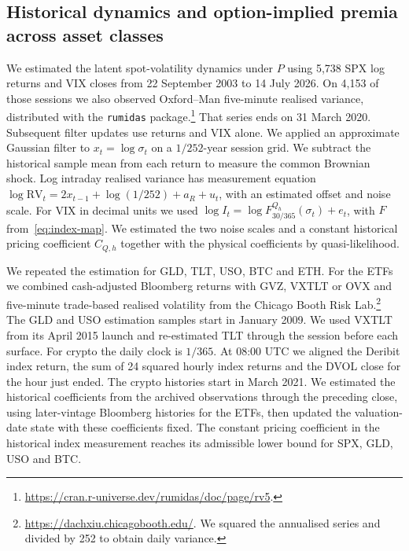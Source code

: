 \documentclass[11pt,a4paper]{article}
\theoremstyle{definition}
\theoremstyle{remark}
\newcommand{\ReplicationBlock}[2]{\ignorespaces}
\begin{document}
\ReplicationBlock{end}{calibration_section.tex}

\FloatBarrier
\ReplicationBlock{begin}{physical_pricing.tex}
\subsection{Historical dynamics and option-implied premia across asset classes}
\label{sec:asset-physical-premium}
We estimated the latent spot-volatility dynamics under $P$ using 5,738 SPX
log returns and VIX closes from 22 September 2003 to 14 July 2026.
On 4,153 of those sessions we also observed Oxford--Man five-minute realised
variance, distributed with the \texttt{rumidas} package.\footnote{\url{https://cran.r-universe.dev/rumidas/doc/page/rv5}.}
That series ends on 31 March 2020. Subsequent filter updates use returns and VIX alone.
We applied an approximate Gaussian filter to $x_t=\log\sigma_t$ on a $1/252$-year session grid.
We subtract the historical sample mean from each return to measure the common Brownian
shock. Log intraday realised variance has measurement equation
$\log \mathrm{RV}_t=2x_{t-1}+\log(1/252)+a_R+u_t$, with an estimated offset and noise scale.
For VIX in decimal units we used $\log I_t=\log F^{Q_h}_{30/365}(\sigma_t)+e_t$, with $F$
from~\eqref{eq:index-map}. We estimated the two noise scales and a constant historical
pricing coefficient $C_{Q,h}$ together with the physical coefficients by quasi-likelihood.

We repeated the estimation for GLD, TLT, USO, BTC and ETH.
For the ETFs we combined cash-adjusted Bloomberg returns with GVZ, VXTLT or OVX
and five-minute trade-based realised volatility from the Chicago Booth Risk Lab.\footnote{
\url{https://dachxiu.chicagobooth.edu/}. We squared the annualised series and divided
by 252 to obtain daily variance.} The GLD and USO estimation samples start in January
2009. We used VXTLT from its April 2015 launch and re-estimated TLT through the
session before each surface. For crypto the daily clock is $1/365$. At 08:00 UTC
we aligned the Deribit index return, the sum of 24 squared hourly index returns and
the DVOL close for the hour just ended. The crypto histories start in March 2021.
We estimated the historical coefficients from the archived observations through
the preceding close, using later-vintage Bloomberg histories for the ETFs, then updated
the valuation-date state with these coefficients fixed.
The constant pricing coefficient in the historical index measurement reaches
its admissible lower bound for SPX, GLD, USO and BTC.
\end{document}
